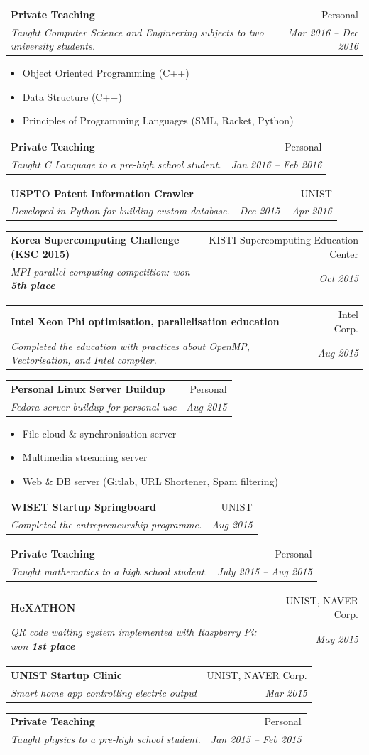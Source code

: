 \documentclass[letterpaper,11pt]{article}
\makeatletter
\newcommand{\resumeSimpleItem}[1]{
  \item\small{
    {#1 \vspace{-2pt}}
  }
}
\newcommand{\resumeSubheading}[4]{
  \vspace{-1pt}\item
    \begin{tabular*}{0.97\textwidth}{l@{\extracolsep{\fill}}r}
      \textbf{#1} & #2 \\
      \textit{\small#3} & \textit{\small #4} \\
    \end{tabular*}\vspace{-5pt}
}
\newcommand{\resumeItemListStart}{\begin{itemize}}
\newcommand{\resumeItemListEnd}{\end{itemize}\vspace{-5pt}}
\makeatother
\begin{document}
    \resumeSubheading
      {Private Teaching}{Personal}
      {Taught Computer Science and Engineering subjects to two university students.}{Mar 2016 -- Dec 2016}
      \resumeItemListStart
        \resumeSimpleItem{Object Oriented Programming (C++)}
        \resumeSimpleItem{Data Structure (C++)}
        \resumeSimpleItem{Principles of Programming Languages (SML, Racket, Python)}
      \resumeItemListEnd
      
    \resumeSubheading
      {Private Teaching}{Personal}
      {Taught C Language to a pre-high school student.}{Jan 2016 -- Feb 2016}
      
    \resumeSubheading
      {USPTO Patent Information Crawler}{UNIST}
      {Developed in Python for building custom database.}{Dec 2015 -- Apr 2016}
      
    \resumeSubheading
      {Korea Supercomputing Challenge (KSC 2015)}{KISTI Supercomputing Education Center}
      {MPI parallel computing competition: won \textbf{5th place}}{Oct 2015}
      
    \resumeSubheading
      {Intel Xeon Phi optimisation, parallelisation education}{Intel Corp.}
      {Completed the education with practices about OpenMP, Vectorisation, and Intel compiler.}{Aug 2015}
      
    \resumeSubheading
      {Personal Linux Server Buildup}{Personal}
      {Fedora server buildup for personal use}{Aug 2015}
      \resumeItemListStart
        \resumeSimpleItem{File cloud \& synchronisation server}
        \resumeSimpleItem{Multimedia streaming server}
        \resumeSimpleItem{Web \& DB server (Gitlab, URL Shortener, Spam filtering)}
      \resumeItemListEnd
    \resumeSubheading
      {WISET Startup Springboard}{UNIST}
      {Completed the entrepreneurship programme.}{Aug 2015}
    
    \resumeSubheading
      {Private Teaching}{Personal}
      {Taught mathematics to a high school student.}{July 2015 -- Aug 2015}
      
    \resumeSubheading
      {HeXATHON}{UNIST, NAVER Corp.}
      {QR code waiting system implemented with Raspberry Pi: won \textbf{1st place}}{May 2015}
      
    \resumeSubheading
      {UNIST Startup Clinic}{UNIST, NAVER Corp.}
      {Smart home app controlling electric output}{Mar 2015}
    
    \resumeSubheading
      {Private Teaching}{Personal}
      {Taught physics to a pre-high school student.}{Jan 2015 -- Feb 2015}
      
\end{document}
